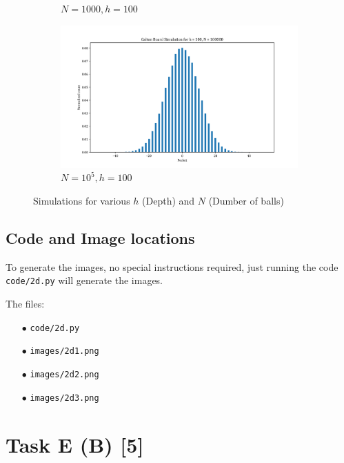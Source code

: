 \begin{figure}[H]
\begin{subfigure}{0.4\textwidth}
        \caption{$N = 1000, h = 100$}
        \label{fig_a2d3}
    \end{subfigure}
    \begin{subfigure}{0.4\textwidth}
        \centering
        \includegraphics[width=\textwidth]{assets/images/a2d4.png}
        \caption{$N = 10^5, h = 100$}
        \label{fig_a2d4}
    \end{subfigure}
    \caption{Simulations for various $h$ (Depth) and $N$ (Dumber of balls)}
\end{figure}

\subsection*{Code and Image locations}

To generate the images, no special instructions required, just running the code
\texttt{code/2d.py} will generate the images.

\vspace{10pt}
\noindent The files:
\begin{itemize}
    \item[$\bullet$] \texttt{code/2d.py}
    \item[$\bullet$] \texttt{images/2d1.png}
    \item[$\bullet$] \texttt{images/2d2.png}
    \item[$\bullet$] \texttt{images/2d3.png}
\end{itemize}

\section*{\colS{$\S$} Task E (B) \hfill \normalfont \large [5]}

